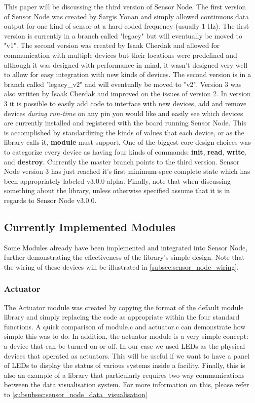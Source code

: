 \documentclass{article}
\begin{document}
This paper will be discussing the third version of Sensor Node. The first version of Sensor Node was created by Sargis Yonan and simply allowed continuous data output for one kind of sensor at a hard-coded frequency (usually 1 Hz). The first version is currently in a branch called "legacy" but will eventually be moved to "v1". The second version was created by Isaak Cherdak and allowed for communication with multiple devices but their locations were predefined and although it was designed with performance in mind, it wasn't designed very well to allow for easy integration with new kinds of devices. The second version is in a branch called "legacy\_v2" and will eventually be moved to "v2". Version 3 was also written by Isaak Cherdak and improved on the issues of version 2. In version 3 it is possible to easily add code to interface with new devices, add and remove devices \textit{during run-time} on any pin you would like and easily see which devices are currently installed and registered with the board running Sensor Node. This is accomplished by standardizing the kinds of values that each device, or as the library calls it, \textbf{module} must support. One of the biggest core design choices was to categorize every device as having four kinds of commands: \textbf{init}, \textbf{read}, \textbf{write}, and \textbf{destroy}. Currently the master branch points to the third version. Sensor Node version 3 has just reached it's first minimum-spec complete state which has been appropriately labeled v3.0.0 alpha. Finally, note that when discussing something about the library, unless otherwise specified assume that it is in regards to Sensor Node v3.0.0.

\subsection{Currently Implemented Modules}
\label{subsec:sensor_node_current_modules}

Some Modules already have been implemented and integrated into Sensor Node, further demonstrating the effectiveness of the library's simple design. Note that the wiring of these devices will be illustrated in \autoref{subsec:sensor_node_wiring}.

\subsubsection{Actuator}

The Actuator module was created by copying the format of the default module library and simply replacing the code as appropriate within the four standard functions. A quick comparison of module.c and actuator.c can demonstrate how simple this was to do. In addition, the actuator module is a very simple concept: a device that can be turned on or off. In our case we used LEDs as the physical devices that operated as actuators. This will be useful if we want to have a panel of LEDs to display the status of various systems inside a facility. Finally, this is also an example of a library that particularly requires two way communications between the data visualisation system. For more information on this, please refer to \autoref{subsubsec:sensor_node_data_visualisation}
\end{document}
